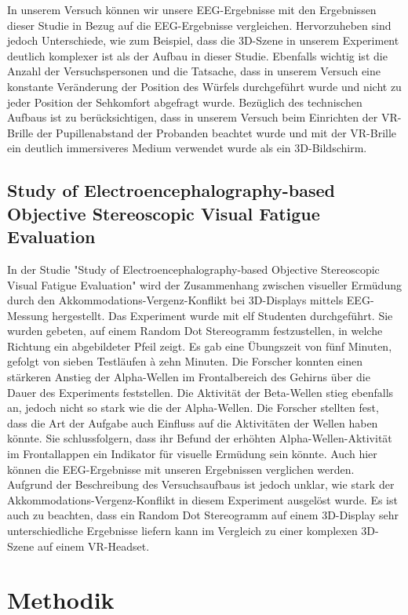 \documentclass[conference]{IEEEtran}
\begin{document}
In unserem Versuch können wir unsere EEG-Ergebnisse mit den Ergebnissen dieser Studie in Bezug auf die EEG-Ergebnisse vergleichen. Hervorzuheben sind jedoch Unterschiede, wie zum Beispiel, dass die 3D-Szene in unserem Experiment deutlich komplexer ist als der Aufbau in dieser Studie. Ebenfalls wichtig ist die Anzahl der Versuchspersonen und die Tatsache, dass in unserem Versuch eine konstante Veränderung der Position des Würfels durchgeführt wurde und nicht zu jeder Position der Sehkomfort abgefragt wurde. Bezüglich des technischen Aufbaus ist zu berücksichtigen, dass in unserem Versuch beim Einrichten der VR-Brille der Pupillenabstand der Probanden beachtet wurde und mit der VR-Brille ein deutlich immersiveres Medium verwendet wurde als ein 3D-Bildschirm.


\subsection{Study of Electroencephalography-based Objective Stereoscopic Visual Fatigue Evaluation}
In der Studie "\textnormal{Study} of Electroencephalography-based Objective Stereoscopic Visual Fatigue Evaluation" \cite{b5} wird der Zusammenhang zwischen visueller Ermüdung durch den Akkommodations-Vergenz-Konflikt bei 3D-Displays mittels EEG-Messung hergestellt.
Das Experiment wurde mit elf Studenten durchgeführt. Sie wurden gebeten, auf einem Random Dot Stereogramm festzustellen, in welche Richtung ein abgebildeter Pfeil zeigt. Es gab eine Übungszeit von fünf Minuten, gefolgt von sieben Testläufen à zehn Minuten.
Die Forscher konnten einen stärkeren Anstieg der Alpha-Wellen im Frontalbereich des Gehirns über die Dauer des Experiments feststellen. Die Aktivität der Beta-Wellen stieg ebenfalls an, jedoch nicht so stark wie die der Alpha-Wellen. Die Forscher stellten fest, dass die Art der Aufgabe auch Einfluss auf die Aktivitäten der Wellen haben könnte. Sie schlussfolgern, dass ihr Befund der erhöhten Alpha-Wellen-Aktivität im Frontallappen ein Indikator für visuelle Ermüdung sein könnte.
Auch hier können die EEG-Ergebnisse mit unseren Ergebnissen verglichen werden. Aufgrund der Beschreibung des Versuchsaufbaus ist jedoch unklar, wie stark der Akkommodations-Vergenz-Konflikt in diesem Experiment ausgelöst wurde. Es ist auch zu beachten, dass ein Random Dot Stereogramm auf einem 3D-Display sehr unterschiedliche Ergebnisse liefern kann im Vergleich zu einer komplexen 3D-Szene auf einem VR-Headset.
 

\section{Methodik}
\end{document}

